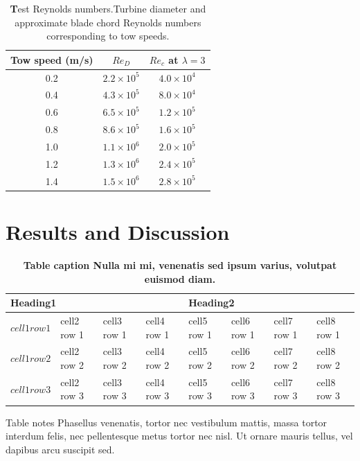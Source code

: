 \documentclass[10pt,letterpaper]{article}
\begin{document}


\begin{table}[ht]
\centering
\begin{tabular}{c|c|c}
Tow speed (m/s) & $Re_D$ & $Re_c$ at $\lambda = 3$ \\ 
\hline 
0.2 & $2.2 \times 10^5$ & $4.0 \times 10^4$ \\ 
0.4 & $4.3 \times 10^5$ & $8.0 \times 10^4$ \\ 
0.6 & $6.5 \times 10^5$ & $1.2 \times 10^5$ \\ 
0.8 & $8.6 \times 10^5$ & $1.6 \times 10^5$ \\ 
1.0 & $1.1 \times 10^6$ & $2.0 \times 10^5$ \\ 
1.2 & $1.3 \times 10^6$ & $2.4 \times 10^5$ \\ 
1.4 & $1.5 \times 10^6$ & $2.8 \times 10^5$ \\
\end{tabular} 
\caption{{\textbf Test Reynolds numbers.}Turbine diameter and approximate blade 
chord Reynolds numbers corresponding to tow speeds.} \label{tab:re}
\end{table}


\section*{Results and Discussion}



\begin{table}[!ht]
\begin{adjustwidth}{-2.25in}{0in} %
\caption{
{\bf Table caption Nulla mi mi, venenatis sed ipsum varius, volutpat euismod diam.}}
\begin{tabular}{|l|l|l|l|l|l|l|l|}
\hline
\multicolumn{4}{|l|}{\bf Heading1} & \multicolumn{4}{|l|}{\bf Heading2}\\ \hline
$cell1 row1$ & cell2 row 1 & cell3 row 1 & cell4 row 1 & cell5 row 1 & cell6 row 1 & cell7 row 1 & cell8 row 1\\ \hline
$cell1 row2$ & cell2 row 2 & cell3 row 2 & cell4 row 2 & cell5 row 2 & cell6 row 2 & cell7 row 2 & cell8 row 2\\ \hline
$cell1 row3$ & cell2 row 3 & cell3 row 3 & cell4 row 3 & cell5 row 3 & cell6 row 3 & cell7 row 3 & cell8 row 3\\ \hline
\end{tabular}
\begin{flushleft} 
Table notes Phasellus venenatis, tortor nec vestibulum mattis, massa tortor interdum felis, nec 
pellentesque metus tortor nec nisl. Ut ornare mauris tellus, vel dapibus arcu suscipit sed.
\end{flushleft}
\label{table1}
\end{adjustwidth}
\end{table}
\end{document}
